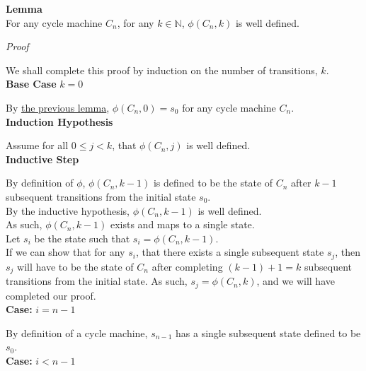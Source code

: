 \documentclass[a4paper,12pt]{article}
\begin{document}
\label{lemma:phi_well_defined}
\hypertarget{lemma:phi_well_defined}{}
\begin{tcolorbox}
\textbf{Lemma}\\
For any cycle machine $C_n$, for any $k \in \mathbb{N}$, $\phi(C_n, k)$ is well defined.
\end{tcolorbox}

\noindent
\textit{Proof}

\noindent We shall complete this proof by induction on the number of transitions, $k$.\\


\noindent
\textbf{Base Case} $k = 0$

\noindent By \hyperlink{lemma:phi_of_0}{the previous lemma}, $\phi(C_n, 0) = s_0$ for any cycle machine $C_n$.\\


\noindent
\textbf{Induction Hypothesis}

\noindent Assume for all $0 \leq j < k$, that $\phi(C_n, j)$ is well defined.\\


\noindent
\textbf{Inductive Step}

\noindent By definition of $\phi$, $\phi(C_n, k - 1)$ is defined to be the state of $C_n$ after $k - 1$ subsequent transitions from the initial state $s_0$.\\

\noindent By the inductive hypothesis, $\phi(C_n, k - 1)$ is well defined.\\

\noindent As such, $\phi(C_n, k - 1)$ exists and maps to a single state.\\

\noindent Let $s_i$ be the state such that $s_i = \phi(C_n, k - 1)$.\\

\noindent If we can show that for any $s_i$, that there exists a single subsequent state $s_j$, then $s_j$ will have to be the state of $C_n$ after completing $(k - 1) + 1 = k$ subsequent transitions from the initial state. As such, $s_j = \phi(C_n, k)$, and we will have completed our proof.\\ 


\noindent
\textbf{Case:} $i = n - 1$

\noindent By definition of a cycle machine, $s_{n-1}$ has a single subsequent state defined to be $s_0$.\\


\noindent
\textbf{Case:} $i < n - 1$
\end{document}
